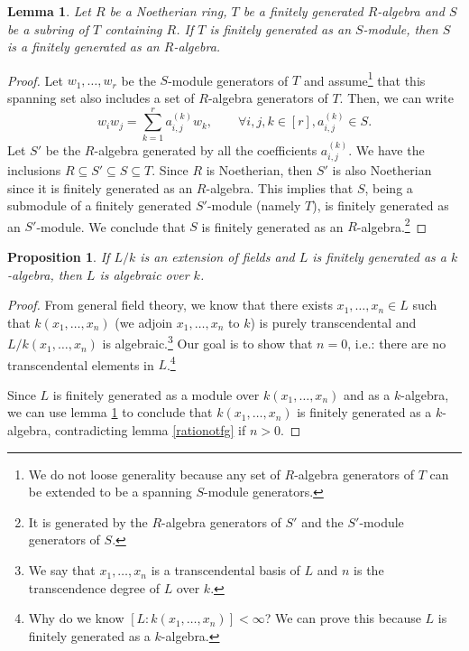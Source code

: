 \documentclass{tufte-handout} %
\newtheorem{prop}[thm]{Proposition}
\newtheorem{lem}[thm]{Lemma}
\theoremstyle{definition}
\theoremstyle{remark}
\begin{document}
\begin{lem}\label{fingensubalg}
	Let $R$ be a Noetherian ring, $T$ be a finitely generated $R$-algebra and $S$ be a subring of $T$ containing $R$. If $T$ is finitely generated as an $S$-module, then $S$ is a finitely generated as an $R$-algebra.
\end{lem}
\begin{proof}
	Let $w_1, \dots, w_r$ be the $S$-module generators of $T$ and assume\footnote{We do not loose generality because any set of $R$-algebra generators of $T$ can be extended to be a spanning $S$-module generators.} that this spanning set also includes a set of $R$-algebra generators of $T$. Then, we can write
	\[w_iw_j = \sum_{k=1}^r a_{i,j}^{(k)} w_k, \qquad\forall i,j,k \in [r], a_{i,j}^{(k)} \in S.\]
	Let $S'$ be the $R$-algebra generated by all the coefficients $a_{i,j}^{(k)}$. We have the inclusions $R \subseteq S' \subseteq S \subseteq T$. Since $R$ is Noetherian, then $S'$ is also Noetherian since it is finitely generated as an $R$-algebra. This implies that $S$, being a submodule of a finitely generated $S'$-module (namely $T$), is finitely generated as an $S'$-module. We conclude that $S$ is finitely generated as an $R$-algebra.\footnote{It is generated by the $R$-algebra generators of $S'$ and the $S'$-module generators of $S$.}
\end{proof}

\begin{prop}\label{lemnull}
	If $L/k$ is an extension of fields and $L$ is finitely generated as a $k$-algebra, then $L$ is algebraic over $k$.
\end{prop}
\begin{proof}
	From general field theory, we know that there exists $x_1, \dots, x_n \in L$ such that $k(x_1, \dots, x_n)$ (we adjoin $x_1, \dots, x_n$ to $k$) is purely transcendental and $L/k(x_1, \dots, x_n)$ is algebraic.\footnote{We say that $x_1, \dots, x_n$ is a transcendental basis of $L$ and $n$ is the transcendence degree of $L$ over $k$.} Our goal is to show that $n = 0$, i.e.: there are no transcendental elements in $L$.\footnote{Why do we know $[L:k(x_1, \dots, x_n)] < \infty$? We can prove this because $L$ is finitely generated as a $k$-algebra. %
	} 

	Since $L$ is finitely generated as a module over $k(x_1,\dots, x_n)$ and as a $k$-algebra, we can use lemma \ref{fingensubalg} to conclude that $k(x_1, \dots, x_n)$ is finitely generated as a $k$-algebra, contradicting lemma \ref{rationotfg} if $n > 0$.
\end{proof}
\end{document}
